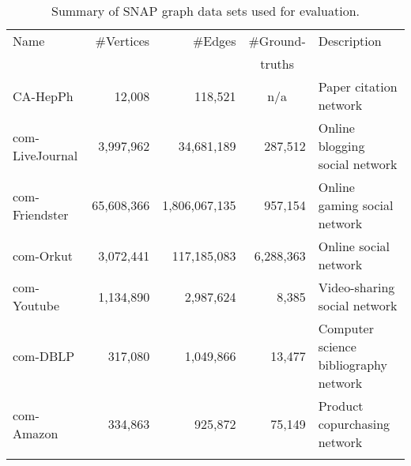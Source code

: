 \begin{table}
  \centering
  \def\tabcolsep{0.2em}
  \begin{tabular}{l r r r p{9em}}
    Name            & \#Vertices &       \#Edges & \multicolumn{1}{c}{\#Ground-} & Description \\
                    &            &               & \multicolumn{1}{c}{truths}    &             \\
    \hline
    CA-HepPh        &    12,008  &    118,521    & \multicolumn{1}{c}{n/a}       & Paper citation network \\
    com-LiveJournal &  3,997,962 &    34,681,189 & 287,512        & Online blogging social network \\
    com-Friendster  & 65,608,366 & 1,806,067,135 & 957,154        & Online gaming social network \\
    com-Orkut       &  3,072,441 &   117,185,083 & 6,288,363      & Online social network \\
    com-Youtube     &  1,134,890 &     2,987,624 & 8,385          & Video-sharing social network \\
    com-DBLP        &    317,080 &     1,049,866 & 13,477         & Computer science bibliography network \\
    com-Amazon      &    334,863 &       925,872 & 75,149         & Product copurchasing network \\
    \hline
    \\[-1ex]
  \end{tabular}
  \caption{Summary of SNAP graph data sets used for evaluation.}
  \label{table-snap}
\end{table}





